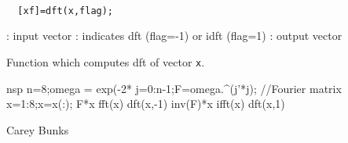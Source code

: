 
\begin{mandesc}
   \\ %
\end{mandesc}
\begin{calling_sequence}
\begin{verbatim}
  [xf]=dft(x,flag);  
\end{verbatim}
\end{calling_sequence}
\begin{parameters}
  \begin{varlist}
    : input vector
    : indicates dft (flag=-1)  or idft (flag=1)
    : output vector
  \end{varlist}
\end{parameters}
\begin{mandescription}
  Function which computes dft of vector \verb!x!.
\end{mandescription}
\begin{examples}
  \begin{mintednsp}{nsp}
    n=8;omega = exp(-2*%
    j=0:n-1;F=omega.^(j'*j);  //Fourier matrix
    x=1:8;x=x(:);
    F*x
    fft(x)
    dft(x,-1)
    inv(F)*x
    ifft(x)
    dft(x,1)
  \end{mintednsp}
\end{examples}
\begin{manseealso}
\end{manseealso}
\begin{authors}
    Carey Bunks  
\end{authors}
